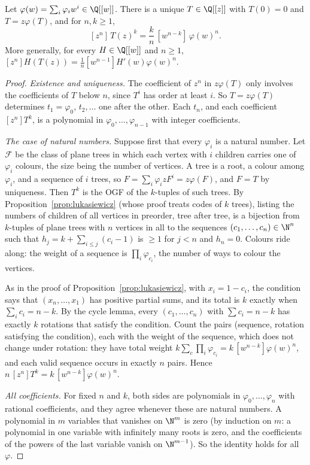 \begin{theorem}\label{thm:lagrange}
Let $\varphi(w)=\sum_i\varphi_iw^i\in\Q[[w]]$. There is a unique $T\in\Q[[z]]$ with $T(0)=0$ and $T=z\varphi(T)$, and for $n,k\ge1$,
\[
[z^n]\,T(z)^k=\frac kn\,[w^{n-k}]\,\varphi(w)^n .
\]
More generally, for every $H\in\Q[[w]]$ and $n\ge1$, $[z^n]H(T(z))=\frac1n[w^{n-1}]H'(w)\varphi(w)^n$.
\end{theorem}
\begin{proof}
\emph{Existence and uniqueness.} The coefficient of $z^n$ in $z\varphi(T)$ only involves the coefficients of $T$ below $n$, since $T^i$ has order at least $i$.
So $T=z\varphi(T)$ determines $t_1=\varphi_0$, $t_2,\dots$ one after the other. Each $t_n$, and each coefficient $[z^n]T^k$, is a polynomial in $\varphi_0,\dots,\varphi_{n-1}$ with
integer coefficients.

\emph{The case of natural numbers.} Suppose first that every $\varphi_i$ is a natural number. Let $\mathcal F$ be the class of plane trees in which each
vertex with $i$ children carries one of $\varphi_i$ colours, the size being the number of vertices. A tree is a root, a colour among $\varphi_i$, and a
sequence of $i$ trees, so $F=\sum_i\varphi_izF^i=z\varphi(F)$, and $F=T$ by uniqueness. Then $T^k$ is the OGF of the $k$-tuples of such trees. By
Proposition~\ref{prop:lukasiewicz} (whose proof treats codes of $k$ trees), listing the numbers of children of all vertices in preorder,
tree after tree, is a bijection from $k$-tuples of plane trees with $n$ vertices in all to the sequences $(c_1,\dots,c_n)\in\N^n$ such that
$h_j=k+\sum_{i\le j}(c_i-1)$ is $\ge1$ for $j<n$ and $h_n=0$. Colours ride along: the weight of a sequence is $\prod_i\varphi_{c_i}$, the number of ways to
colour the vertices.

As in the proof of Proposition~\ref{prop:lukasiewicz}, with $x_i=1-c_i$, the condition says that $(x_n,\dots,x_1)$ has positive partial sums, and its total
is $k$ exactly when $\sum_ic_i=n-k$. By the cycle lemma, every $(c_1,\dots,c_n)$ with $\sum c_i=n-k$ has exactly $k$ rotations that satisfy the condition.
Count the pairs (sequence, rotation satisfying the condition), each with the weight of the sequence, which does not change under
rotation: they have total weight $k\sum_c\prod_i\varphi_{c_i}=k\,[w^{n-k}]\varphi(w)^n$, and each valid sequence occurs in exactly $n$ pairs. Hence
$n\,[z^n]T^k=k\,[w^{n-k}]\varphi(w)^n$.

\emph{All coefficients.} For fixed $n$ and $k$, both sides are polynomials in $\varphi_0,\dots,\varphi_n$ with rational coefficients, and they agree whenever
these are natural numbers. A polynomial in $m$ variables that vanishes on $\N^m$ is zero (by induction on $m$: a polynomial in one variable
with infinitely many roots is zero, and the coefficients of the powers of the last variable vanish on $\N^{m-1}$). So the identity holds
for all $\varphi$.


\end{proof}

